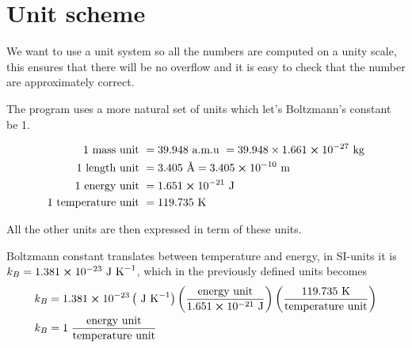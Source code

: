 \documentclass[11pt]{article}
\begin{document}
\appendix
	\section{Unit scheme}

	We want to use a unit system so all the numbers are computed on a unity scale, this ensures that there will be no overflow and it is easy to check that the number are approximately correct.


		The program uses a more natural set of units which let's Boltzmann's constant be 1.

		\begin{align}
			1 \text{ mass unit } &=   39.948 \text{ a.m.u } =  39.948\times 1.661\cross 10^{-27} \text{ kg}
			\\
			1 \text{ length unit } &= 3.405 \text{ \AA} = 3.405\cross 10^{-10} \text{ m}
			\\
			1 \text{ energy unit } &= 1.651 \cross 10^{-21} \text{ J}
			\\
			1 \text{ temperature unit } &= 119.735 \text{ K}
		\end{align}


	All the other units are then expressed in term of these units.

	Boltzmann constant translates between temperature and energy, in SI-units it is \( k_B = 1.381 \cross 10^{-23} \text{ J K}^{-1}\), which in the previously defined units becomes
	\begin{align}
	k_B &= 1.381 \cross 10^{-23}  \left(\text{ J K}^{-1}\right)  \left(\frac{\text{energy unit}}{1.651 \cross 10^{-21} \text{ J}}\right)
	\left( \frac{119.735 \text{ K}}{\text{temperature unit}} \right)
	\\
	k_B &= 1 \; \frac{\text{energy unit}}{\text{temperature unit}}
	\end{align}
\end{document}
